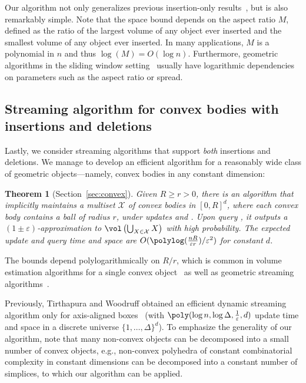 \documentclass[a4paper, 11pt]{article}
\newtheorem{theorem}{Theorem}[section]
\newcommand{\eps}{\varepsilon}
\newcommand{\class}[1]{\mathcal{#1}}
\begin{document}
Our algorithm not only generalizes previous insertion-only results~\cite{MVC21}, but is also remarkably simple. Note that the space bound depends on the aspect ratio $M$, defined as the ratio of the largest volume of any object ever inserted and the smallest volume of any object ever inserted. In many applications, $M$ is a polynomial in $n$ and thus $\log(M) = O(\log n)$. Furthermore, geometric algorithms in the sliding window setting~\cite{FeigenbaumKZ04,ChanS06} usually have logarithmic dependencies on parameters such as the aspect ratio or spread.

\subsection{Streaming algorithm for convex bodies with insertions and deletions}
Lastly, we consider streaming algorithms that support \emph{both} insertions and deletions.
We manage to develop an efficient algorithm for a reasonably wide class of geometric objects---namely, convex bodies in any constant dimension:

\begin{theorem}[Section~\ref{sec:convex}]
\label{thm:convexalgo}
Given $R \ge r > 0$, there is an algorithm that implicitly maintains a multiset $\class{X}$ of convex bodies in $[0,R]^d$, where each convex body contains a ball of radius $r$, under updates  and . Upon query \est{}, it outputs a $(1\pm\eps)$-approximation to $\vol\left(\bigcup_{X \in \class{X}} X\right)$ with high probability. The expected update and query time and space are $O(\polylog(\frac{nR}{\eps r}) / \eps^2)$ for constant $d$.
\end{theorem}

The bounds depend polylogarithmically on $R/r$, which is common in volume estimation algorithms for a single convex object~\cite{DyerFK91} as well as geometric streaming algorithms~\cite{Indyk04,FrahlingIS08}.

Previously, Tirthapura and Woodruff obtained an efficient dynamic streaming algorithm only for axis-aligned boxes~\cite{TW12} (with $\poly(\log n, \log \Delta, \frac{1}{\eps}, d)$ update time and space in a discrete universe $\{1,\ldots,\Delta\}^d$).
To emphasize the generality of our algorithm, note that many non-convex objects can be decomposed into a small number of convex objects, e.g., non-convex polyhedra of constant combinatorial complexity in constant dimensions can be decomposed into a constant number of simplices, to which our algorithm can be  applied.
\end{document}
